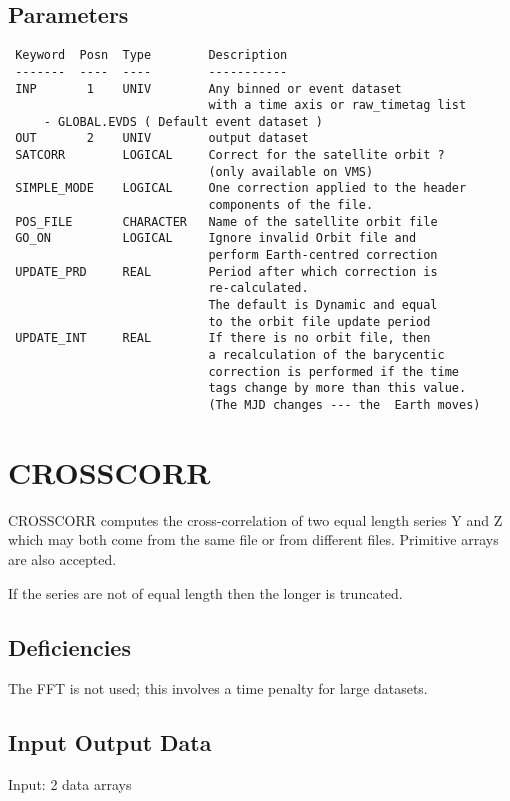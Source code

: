 \documentclass{book}
\renewcommand{\_}{{\tt\char'137}}     %
\begin{document}
\subsection{Parameters}
\begin{verbatim}
 Keyword  Posn  Type        Description
 -------  ----  ----        -----------
 INP       1    UNIV        Any binned or event dataset
                            with a time axis or raw_timetag list
     - GLOBAL.EVDS ( Default event dataset )
 OUT       2    UNIV        output dataset
 SATCORR        LOGICAL     Correct for the satellite orbit ?
                            (only available on VMS)
 SIMPLE_MODE    LOGICAL     One correction applied to the header
                            components of the file.
 POS_FILE       CHARACTER   Name of the satellite orbit file
 GO_ON          LOGICAL     Ignore invalid Orbit file and
                            perform Earth-centred correction
 UPDATE_PRD     REAL        Period after which correction is
                            re-calculated.
                            The default is Dynamic and equal
                            to the orbit file update period
 UPDATE_INT     REAL        If there is no orbit file, then
                            a recalculation of the barycentic
                            correction is performed if the time
                            tags change by more than this value.
                            (The MJD changes --- the  Earth moves)

\end{verbatim}\section{CROSSCORR}
CROSSCORR computes the cross-correlation of two equal length series
Y and Z which may both come from the same file or from different
files. Primitive arrays are also accepted.

If the series are not of equal length then the longer is
truncated.

\subsection{Deficiencies}
The FFT is not used; this involves a time penalty for large datasets.

\subsection{Input Output Data}
Input: 2 data arrays
\end{document}
